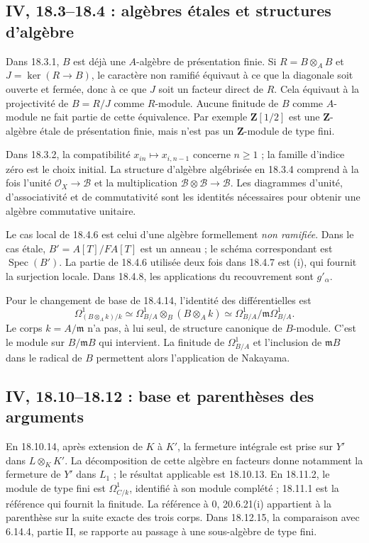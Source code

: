 \documentclass[11pt,a4paper]{article}
\begin{document}
\subsection{IV, 18.3--18.4 : algèbres étales et structures d’algèbre}
\label{note:iv4-unramified}
Dans 18.3.1, $B$ est déjà une $A$-algèbre de présentation finie.
Si $R=B\otimes_A B$ et $J=\ker(R\to B)$, le caractère non ramifié
équivaut à ce que la diagonale soit ouverte et fermée, donc à ce que
$J$ soit un facteur direct de $R$. Cela équivaut à la projectivité
de $B=R/J$ comme $R$-module. Aucune finitude de $B$ comme $A$-module
ne fait partie de cette équivalence. Par exemple $\mathbf Z[1/2]$
est une $\mathbf Z$-algèbre étale de présentation finie, mais n'est
pas un $\mathbf Z$-module de type fini.

Dans 18.3.2, la compatibilité $x_{in}\mapsto x_{i,n-1}$ concerne
$n\geq1$ ; la famille d'indice zéro est le choix initial.
La structure d'algèbre algébrisée en 18.3.4 comprend à la fois
l'unité $\mathcal O_X\to\mathcal B$ et la multiplication
$\mathcal B\otimes\mathcal B\to\mathcal B$. Les diagrammes d'unité,
d'associativité et de commutativité sont les identités nécessaires
pour obtenir une algèbre commutative unitaire.

Le cas local de 18.4.6 est celui d'une algèbre formellement
\emph{non ramifiée}. Dans le cas étale, $B'=A[T]/FA[T]$ est un
anneau ; le schéma correspondant est $\operatorname{Spec}(B')$.
La partie de 18.4.6 utilisée deux fois dans 18.4.7 est (i), qui fournit
la surjection locale. Dans 18.4.8, les applications du recouvrement
sont $g'_\alpha$.

Pour le changement de base de 18.4.14, l'identité des différentielles est
\[
 \Omega^1_{(B\otimes_A k)/k}
   \simeq \Omega^1_{B/A}\otimes_B(B\otimes_A k)
   \simeq \Omega^1_{B/A}/\mathfrak m\Omega^1_{B/A}.
\]
Le corps $k=A/\mathfrak m$ n'a pas, à lui seul, de structure canonique
de $B$-module. C'est le module sur $B/\mathfrak mB$ qui intervient.
La finitude de $\Omega^1_{B/A}$ et l'inclusion de $\mathfrak mB$ dans
le radical de $B$ permettent alors l'application de Nakayama.

\subsection{IV, 18.10--18.12 : base et parenthèses des arguments}
\label{note:iv4-normalization}
En 18.10.14, après extension de $K$ à $K'$, la fermeture intégrale
est prise sur $Y'$ dans $L\otimes_K K'$. La décomposition de cette
algèbre en facteurs donne notamment la fermeture de $Y'$ dans
$L_1$ ; le résultat applicable est 18.10.13.
En 18.11.2, le module de type fini est $\Omega^1_{C/k}$,
identifié à son module complété ; 18.11.1 est la référence qui
fournit la finitude. La référence à 0, 20.6.21(i) appartient à la
parenthèse sur la suite exacte des trois corps.
Dans 18.12.15, la comparaison avec 6.14.4, partie II, se rapporte
au passage à une sous-algèbre de type fini.
\end{document}
